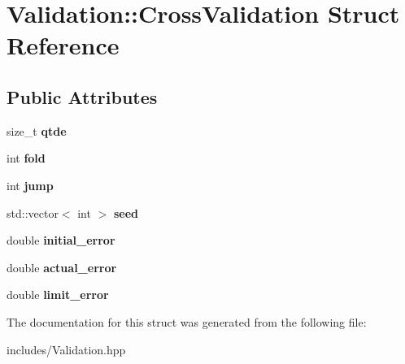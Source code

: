 \hypertarget{struct_validation_1_1_cross_validation}{}\section{Validation\+:\+:Cross\+Validation Struct Reference}
\label{struct_validation_1_1_cross_validation}
\subsection*{Public Attributes}
\begin{DoxyCompactItemize}
\item 
\mbox{\label{struct_validation_1_1_cross_validation_a6142974f461327982f1792b3d98c58f0}} 
size\+\_\+t {\bfseries qtde}
\item 
\mbox{\label{struct_validation_1_1_cross_validation_a7bb5ef2321cc52831132d90048797691}} 
int {\bfseries fold}
\item 
\mbox{\label{struct_validation_1_1_cross_validation_aff6cc2fdd683703dd9a3d4171d7bbb3a}} 
int {\bfseries jump}
\item 
\mbox{\label{struct_validation_1_1_cross_validation_a4dc05ebc57deb195a30dc20e9f31fd27}} 
std\+::vector$<$ int $>$ {\bfseries seed}
\item 
\mbox{\label{struct_validation_1_1_cross_validation_a955b23e2a05bd8946957354cd4a9c2f2}} 
double {\bfseries initial\+\_\+error}
\item 
\mbox{\label{struct_validation_1_1_cross_validation_a9aac1cbe23f2b9f49d8d6605894c9724}} 
double {\bfseries actual\+\_\+error}
\item 
\mbox{\label{struct_validation_1_1_cross_validation_a33f3d94ce252bbaa31ab065768290fe0}} 
double {\bfseries limit\+\_\+error}
\end{DoxyCompactItemize}


The documentation for this struct was generated from the following file\+:\begin{DoxyCompactItemize}
\item 
includes/Validation.\+hpp\end{DoxyCompactItemize}
